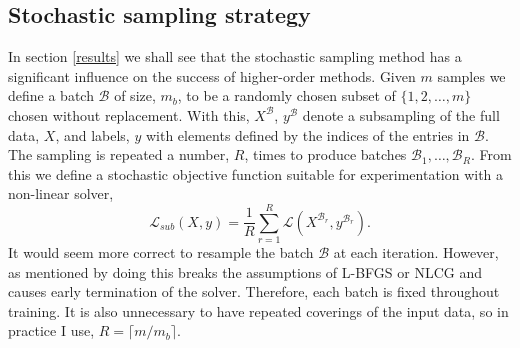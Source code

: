 \documentclass[11pt,twocolumn]{article}
\begin{document}
\subsection{Stochastic sampling strategy}\label{stoch_strategy}
In section \ref{results} we shall see that the stochastic sampling method has a significant influence on the success of higher-order methods. Given $m$ samples we define a batch $\mathcal{B}$ of size, $m_b$, to be a randomly chosen subset of $\{1,2,\ldots,m\}$ chosen without replacement. With this, $X^\mathcal{B}$, $y^\mathcal{B}$ denote a subsampling of the full data, $X$, and labels, $y$ with elements defined by the indices of the entries in  $\mathcal{B}$. The sampling is repeated a number, $R$, times to produce batches  $\mathcal{B}_1, \ldots, \mathcal{B}_R$. From this we define a stochastic objective function suitable for experimentation with a non-linear solver,
\begin{equation}
\mathcal{L}_{sub}(X,y)=\frac{1}{R}\sum_{r=1}^R \mathcal{L}(X^{\mathcal{B}_r}, y^{\mathcal{B}_r}).\label{stoch_resample}
\end{equation}
It would seem more correct to resample the batch $\mathcal{B}$ at each iteration. However, as mentioned by \cite{Martens:Deep} doing this breaks the assumptions of L-BFGS or NLCG and causes early termination of the solver. Therefore, each batch is fixed throughout training. It is also unnecessary to have repeated coverings of the input data, so in practice I use, $R=\lceil m/m_b \rceil$.

\end{document}
